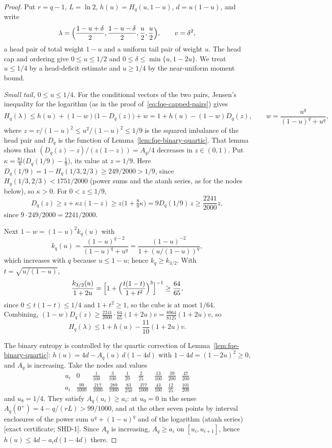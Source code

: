 \begin{proof}
Put $r=q-1$, $L=\ln2$, $h(u)=H_q(u,1-u)$, $d=u(1-u)$, and write
\[
 \lambda=\Bigl(\frac{1-u+\delta}2,\frac{1-u-\delta}2,\frac u2,\frac u2\Bigr),\qquad v=\delta^2,
\]
a head pair of total weight $1-u$ and a uniform tail pair of weight $u$.
The head cap and ordering give $0\le u\le1/2$ and $0\le\delta\le\min\{u,1-2u\}$.
We treat $u\le1/4$ by a head-deficit estimate and $u\ge1/4$ by the near-uniform moment bound.

\emph{Small tail, $0\le u\le1/4$.}
For the conditional vectors of the two pairs, Jensen's inequality for the logarithm (as in the proof
of~\eqref{eq:fqe-capped-pairs}) gives
\[
 H_q(\lambda)\le h(u)+(1-w)\bigl(1-D_q(z)\bigr)+w
 =1+h(u)-(1-w)D_q(z),\qquad w=\frac{u^q}{(1-u)^q+u^q},
\]
where $z=v/(1-u)^2\le u^2/(1-u)^2\le1/9$ is the squared imbalance of the head pair and $D_q$ is the
function of Lemma~\ref{lem:fqe-binary-quartic}. That lemma shows that $(D_q(z)-z)/(z(1-z))=A_q/4$ decreases in
$z\in(0,1)$. Put $\kappa=\tfrac{81}8\bigl(D_q(1/9)-\tfrac19\bigr)$, its value at $z=1/9$. Here
$D_q(1/9)=1-H_q(1/3,2/3)\ge249/2000>1/9$, since $H_q(1/3,2/3)<1751/2000$ (power sums and the atanh series, as for the
nodes below), so $\kappa>0$. For $0<z\le1/9$,
\[
 D_q(z)\ge z+\kappa z(1-z)\ge z\bigl(1+\tfrac89\kappa\bigr)=9D_q(1/9)\,z\ge\frac{2241}{2000}z ,
\]
since $9\cdot249/2000=2241/2000$.

Next $1-w=(1-u)^2k_q(u)$ with
\[
 k_q(u)=\frac{(1-u)^{q-2}}{(1-u)^q+u^q}=\frac{(1-u)^{-2}}{1+(u/(1-u))^q},
\]
which increases with $q$ because $u\le1-u$; hence $k_q\ge k_{3/2}$. With $t=\sqrt{u/(1-u)}$,
\[
 \frac{k_{3/2}(u)}{1+2u}=\Bigl[1+\Bigl(\frac{t(1-t)}{1+t^2}\Bigr)^3\Bigr]^{-1}\ge\frac{64}{65},
\]
since $0\le t(1-t)\le1/4$ and $1+t^2\ge1$, so the cube is at most $1/64$.
Combining, $(1-w)D_q(z)\ge\frac{2241}{2000}\cdot\frac{64}{65}(1+2u)v=\frac{8964}{8125}(1+2u)v$, so
\[
 H_q(\lambda)\le1+h(u)-\frac{11}{10}(1+2u)v.                 \tag{SHD}\label{eq:fqe-small-head-deficit}
\]

The binary entropy is controlled by the quartic correction of Lemma~\ref{lem:fqe-binary-quartic}:
$h(u)=4d-A_q(u)\,d(1-4d)$ with $1-4d=(1-2u)^2\ge0$, and $A_q$ is increasing. Take the nodes and values
\[
\begin{array}{c|cccccccc}
u_i&0&\frac1{100}&\frac3{100}&\frac1{20}&\frac2{25}&\frac{13}{100}&\frac{39}{200}&\frac{47}{200}\\[2pt]\hline
a_i&\frac{99}{1000}&\frac{217}{1000}&\frac{289}{1000}&\frac{83}{250}&\frac{377}{1000}&\frac{43}{100}&\frac{12}{25}&\frac{101}{200}
\end{array}
\]
and $u_8=1/4$. They satisfy $A_q(u_i)\ge a_i$: at $u_0=0$ in the sense $A_q(0^+)=4-q/(rL)>99/1000$, and at the other seven
points by interval enclosures of the power sum $u^q+(1-u)^q$ and of the logarithm (atanh series) [exact certificate; SHD-1].
Since $A_q$ is increasing, $A_q\ge a_i$ on $[u_i,u_{i+1}]$, hence $h(u)\le4d-a_id(1-4d)$ there.


\end{proof}
